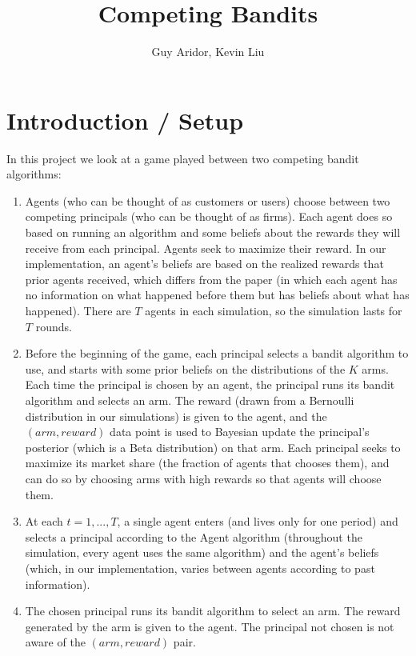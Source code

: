 \documentclass[11pt,letterpaper]{article}
\begin{document}
 

\title{Competing Bandits}
\author{Guy Aridor, Kevin Liu}
\maketitle

\section*{Introduction / Setup}

In this project we look at a game played between two competing bandit algorithms:
\begin{enumerate}
\item Agents (who can be thought of as customers or users) choose between two competing principals (who can be thought of as firms). Each agent does so based on running an algorithm and some beliefs about the rewards they will receive from each principal. Agents seek to maximize their reward. In our implementation, an agent's beliefs are based on the realized rewards that prior agents received, which differs from the paper (in which each agent has no information on what happened before them but has beliefs about what has happened). There are $T$ agents in each simulation, so the simulation lasts for $T$ rounds.
\item Before the beginning of the game, each principal selects a bandit algorithm to use, and starts with some prior beliefs on the distributions of the $K$ arms. Each time the principal is chosen by an agent, the principal runs its bandit algorithm and selects an arm. The reward (drawn from a Bernoulli distribution in our simulations) is given to the agent, and the $(arm, reward)$ data point is used to Bayesian update the principal's posterior (which is a Beta distribution) on that arm. Each principal seeks to maximize its market share (the fraction of agents that chooses them), and can do so by choosing arms with high rewards so that agents will choose them. 
\item At each $t = 1,...,T$, a single agent enters (and lives only for one period) and selects a principal according to the Agent algorithm (throughout the simulation, every agent uses the same algorithm) and the agent's beliefs (which, in our implementation, varies between agents according to past information).
\item The chosen principal runs its bandit algorithm to select an arm. The reward generated by the arm is given to the agent. The principal not chosen is not aware of the $(arm, reward)$ pair.
\end{enumerate}
\end{document}
